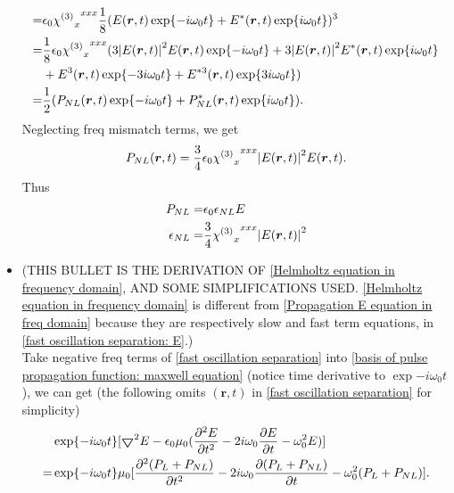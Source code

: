 \documentclass[12pt]{extarticle}
\numberwithin{equation}{section}
\numberwithin{figure}{section}
\numberwithin{table}{section}
\newcommand{\<}{\langle}
\renewcommand{\>}{\rangle}
\theoremstyle{definition}
\newcommand{\Lap}{\boldsymbol{\bigtriangledown}}
\begin{document}
\begin{itemize}
\begin{equation}
\begin{split}
                    =&\epsilon_0 {{\chi^{(3)}}_x}^{xxx} \frac{1}{8}(E(\boldsymbol{r},t)\exp{-i\omega_0 t}+E^{*}(\boldsymbol{r},t)\exp{i\omega_0 t})^3\\
                    =&\frac{1}{8} \epsilon_0 {{\chi^{(3)}}_x}^{xxx}(3\abs{E(\boldsymbol{r},t)}^2 E(\boldsymbol{r},t)\exp{-i\omega_0 t}+3\abs{E(\boldsymbol{r},t)}^2 E^{*}(\boldsymbol{r},t)\exp{i\omega_0 t}\\
                    &+E^3(\boldsymbol{r},t)\exp{-3i\omega_0 t}+E^{*3}(\boldsymbol{r},t)\exp{3i\omega_0 t})\\
                    =&\frac{1}{2}(P_{NL}(\boldsymbol{r},t)\exp{-i\omega_0 t}+P_{NL}^{*}(\boldsymbol{r},t)\exp{i\omega_0 t}).
                \end{split}
                \end{equation}
                Neglecting freq mismatch terms, we get
                \begin{equation}
                    P_{NL}(\boldsymbol{r},t) = \frac{3}{4}\epsilon_0{{\chi^{(3)}}_x}^{xxx}\abs{E(\boldsymbol{r},t)}^2E(\boldsymbol{r},t).
                \end{equation}
                Thus
                \begin{subequations}
                \begin{align}
                    P_{NL}=&\epsilon_0\epsilon_{NL}E\\
                    \epsilon_{NL}=&\frac{3}{4}{{\chi^{(3)}}_x}^{xxx}\abs{E(\boldsymbol{r},t)}^2\label{Nonlinear epsilon relation with chi3 and E}
                \end{align}
                \end{subequations}
            \item \MakeUppercase{(This bullet is the derivation of }\autoref{Helmholtz equation in frequency domain}, \MakeUppercase{and some simplifications used.} \autoref{Helmholtz equation in frequency domain} is different from \autoref{Propagation E equation in freq domain} because they are respectively slow and fast term equations, in \autoref{fast oscillation separation: E}.)\\Take negative freq terms of \autoref{fast oscillation separation} into \autoref{basis of pulse propagation function: maxwell equation} (notice time derivative to $\exp{-i\omega_0 t}$), we can get (the following omits $(\boldsymbol{r},t)$ in \autoref{fast oscillation separation} for simplicity)
                \begin{equation}
                \begin{split}
                    &\exp{-i\omega_0 t}[\Lap^2 E-\epsilon_0 \mu_0(\pdv[2]{E}{t}-2i\omega_0\pdv{E}{t}-\omega_0^2 E)]\\
                    =&\exp{-i\omega_0 t}\mu_0[\pdv[2]{(P_L+P_{NL})}{t}-2i\omega_0\pdv{(P_L+P_{NL})}{t}-\omega_0^2(P_L+P_{NL})].
                \end{split}
                \label{slow oscillatiing term propagation equation derive in section 2.3.1}
                \end{equation}
                

\end{itemize}
\end{document}
